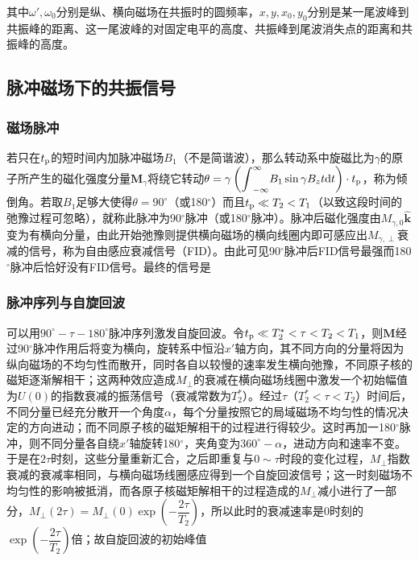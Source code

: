 其中\(\omega',\omega_0\)分别是纵、横向磁场在共振时的圆频率，\(x,y,x_0,y_0\)分别是某一尾波峰到共振峰的距离、这一尾波峰的对固定电平的高度、共振峰到尾波消失点的距离和共振峰的高度。

\subsection{脉冲磁场下的共振信号}\label{ux8109ux51b2ux78c1ux573aux4e0bux7684ux5171ux632fux4fe1ux53f7}

\subsubsection{磁场脉冲}\label{ux78c1ux573aux8109ux51b2}

若只在\(t_{\rm p}\)的短时间内加脉冲磁场\(B_1\)（不是简谐波），那么转动系中旋磁比为\(\gamma\)的原子所产生的磁化强度分量\(\boldsymbol{M}_{\gamma}\)将绕它转动\(\theta = \gamma \left({\displaystyle \int}_{-\infty}^{\infty}{B_1\sin{\gamma B_z}t{\rm d}t}\right)\cdot t_{\rm p}\)，称为倾倒角。若取\(B_1\)足够大使得\(\theta=90^{\circ}\)（或180\(^{\circ}\)）而且\(t_{\rm p}\ll T_2<T_1\)（以致这段时间的弛豫过程可忽略），就称此脉冲为90\(^{\circ}\)脉冲（或180\(^{\circ}\)脉冲）。脉冲后磁化强度由\(M_{\gamma,0}\hat{\boldsymbol{k}}\)变为有横向分量，由此开始弛豫则提供横向磁场的横向线圈内即可感应出\(M_{\gamma,\perp}\)衰减的信号，称为自由感应衰减信号（FID）。由此可见90\(^{\circ}\)脉冲后FID信号最强而180\(^{\circ}\)脉冲后恰好没有FID信号。最终的信号是

\subsubsection{脉冲序列与自旋回波}\label{ux8109ux51b2ux5e8fux5217ux4e0eux81eaux65cbux56deux6ce2}

可以用\(90^{\circ}-\tau-180^{\circ}\)脉冲序列激发自旋回波。令\(t_{\rm p}\ll T_2^*<\tau<T_2<T_1\)，则\(\boldsymbol{M}\)经过90\(^{\circ}\)脉冲作用后将变为横向，旋转系中恒沿\(x'\)轴方向，其不同方向的分量将因为纵向磁场的不均匀性而散开，同时各自以较慢的速率发生横向弛豫，不同原子核的磁矩逐渐解相干；这两种效应造成\(M_{\perp}\)的衰减在横向磁场线圈中激发一个初始幅值为\(U(0)\)的指数衰减的振荡信号（衰减常数为\(T_2^*\)）。经过\(\tau\)（\(T_2^*<\tau<T_2\)）时间后，不同分量已经充分散开一个角度\(\alpha\)，每个分量按照它的局域磁场不均匀性的情况决定的方向进动；而不同原子核的磁矩解相干的过程进行得较少。这时再加一180\(^{\circ}\)脉冲，则不同分量各自绕\(x'\)轴旋转180\(^{\circ}\)，夹角变为\(360^{\circ}-\alpha\)，进动方向和速率不变。于是在\(2\tau\)时刻，这些分量重新汇合，之后即重复与\(0\sim\tau\)时段的变化过程，\(M_{\perp}\)指数衰减的衰减率相同，与横向磁场线圈感应得到一个自旋回波信号；这一时刻磁场不均匀性的影响被抵消，而各原子核磁矩解相干的过程造成的\(M_{\perp}\)减小进行了一部分，\(M_{\perp}(2\tau)=M_{\perp}(0)\exp{\left(-\dfrac{2\tau}{T_2}\right)}\)，所以此时的衰减速率是0时刻的\(\exp{\left(-\dfrac{2\tau}{T_2}\right)}\)倍；故自旋回波的初始峰值

